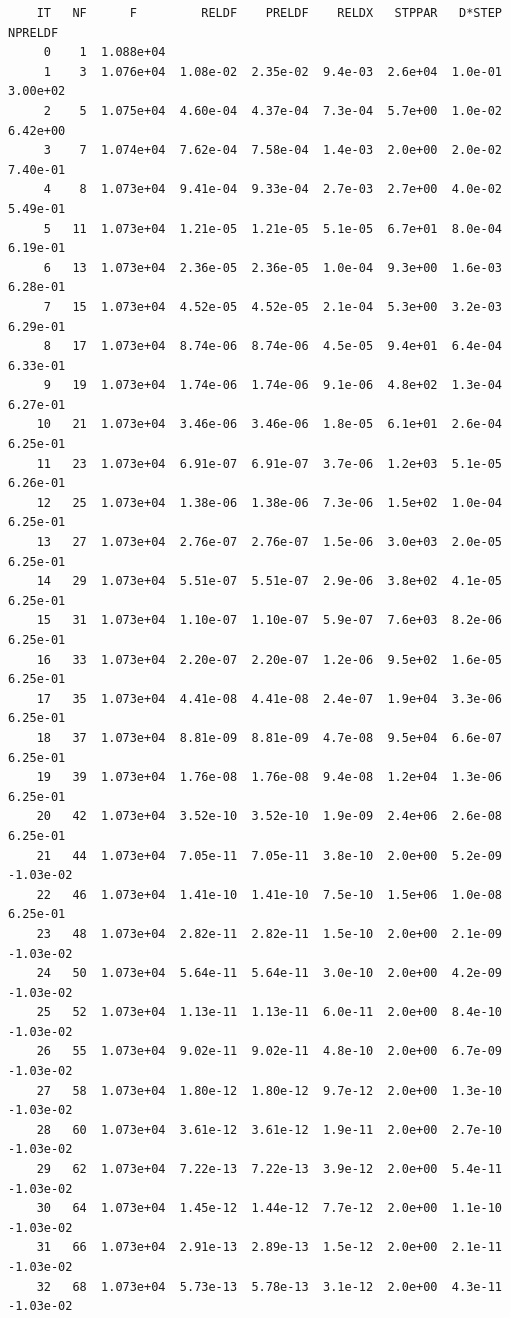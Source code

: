 \documentclass[11pt]{article}\usepackage[]{graphicx}\usepackage[]{color}
\makeatletter
\newenvironment{kframe}{%
 \def\at@end@of@kframe{}%
 \ifinner\ifhmode%
  \def\at@end@of@kframe{\end{minipage}}%
  \begin{minipage}{\columnwidth}%
 \fi\fi%
 \def\FrameCommand##1{\hskip\@totalleftmargin \hskip-\fboxsep
 \colorbox{shadecolor}{##1}\hskip-\fboxsep
     \hskip-\linewidth \hskip-\@totalleftmargin \hskip\columnwidth}%
 \MakeFramed {\advance\hsize-\width
   \@totalleftmargin\z@ \linewidth\hsize
   \@setminipage}}%
 {\par\unskip\endMakeFramed%
 \at@end@of@kframe}
\newenvironment{knitrout}{}{} %
\makeatother
\begin{document}
\begin{knitrout}
\begin{kframe}
\begin{verbatim}
    IT   NF      F         RELDF    PRELDF    RELDX   STPPAR   D*STEP   NPRELDF
     0    1  1.088e+04
     1    3  1.076e+04  1.08e-02  2.35e-02  9.4e-03  2.6e+04  1.0e-01  3.00e+02
     2    5  1.075e+04  4.60e-04  4.37e-04  7.3e-04  5.7e+00  1.0e-02  6.42e+00
     3    7  1.074e+04  7.62e-04  7.58e-04  1.4e-03  2.0e+00  2.0e-02  7.40e-01
     4    8  1.073e+04  9.41e-04  9.33e-04  2.7e-03  2.7e+00  4.0e-02  5.49e-01
     5   11  1.073e+04  1.21e-05  1.21e-05  5.1e-05  6.7e+01  8.0e-04  6.19e-01
     6   13  1.073e+04  2.36e-05  2.36e-05  1.0e-04  9.3e+00  1.6e-03  6.28e-01
     7   15  1.073e+04  4.52e-05  4.52e-05  2.1e-04  5.3e+00  3.2e-03  6.29e-01
     8   17  1.073e+04  8.74e-06  8.74e-06  4.5e-05  9.4e+01  6.4e-04  6.33e-01
     9   19  1.073e+04  1.74e-06  1.74e-06  9.1e-06  4.8e+02  1.3e-04  6.27e-01
    10   21  1.073e+04  3.46e-06  3.46e-06  1.8e-05  6.1e+01  2.6e-04  6.25e-01
    11   23  1.073e+04  6.91e-07  6.91e-07  3.7e-06  1.2e+03  5.1e-05  6.26e-01
    12   25  1.073e+04  1.38e-06  1.38e-06  7.3e-06  1.5e+02  1.0e-04  6.25e-01
    13   27  1.073e+04  2.76e-07  2.76e-07  1.5e-06  3.0e+03  2.0e-05  6.25e-01
    14   29  1.073e+04  5.51e-07  5.51e-07  2.9e-06  3.8e+02  4.1e-05  6.25e-01
    15   31  1.073e+04  1.10e-07  1.10e-07  5.9e-07  7.6e+03  8.2e-06  6.25e-01
    16   33  1.073e+04  2.20e-07  2.20e-07  1.2e-06  9.5e+02  1.6e-05  6.25e-01
    17   35  1.073e+04  4.41e-08  4.41e-08  2.4e-07  1.9e+04  3.3e-06  6.25e-01
    18   37  1.073e+04  8.81e-09  8.81e-09  4.7e-08  9.5e+04  6.6e-07  6.25e-01
    19   39  1.073e+04  1.76e-08  1.76e-08  9.4e-08  1.2e+04  1.3e-06  6.25e-01
    20   42  1.073e+04  3.52e-10  3.52e-10  1.9e-09  2.4e+06  2.6e-08  6.25e-01
    21   44  1.073e+04  7.05e-11  7.05e-11  3.8e-10  2.0e+00  5.2e-09 -1.03e-02
    22   46  1.073e+04  1.41e-10  1.41e-10  7.5e-10  1.5e+06  1.0e-08  6.25e-01
    23   48  1.073e+04  2.82e-11  2.82e-11  1.5e-10  2.0e+00  2.1e-09 -1.03e-02
    24   50  1.073e+04  5.64e-11  5.64e-11  3.0e-10  2.0e+00  4.2e-09 -1.03e-02
    25   52  1.073e+04  1.13e-11  1.13e-11  6.0e-11  2.0e+00  8.4e-10 -1.03e-02
    26   55  1.073e+04  9.02e-11  9.02e-11  4.8e-10  2.0e+00  6.7e-09 -1.03e-02
    27   58  1.073e+04  1.80e-12  1.80e-12  9.7e-12  2.0e+00  1.3e-10 -1.03e-02
    28   60  1.073e+04  3.61e-12  3.61e-12  1.9e-11  2.0e+00  2.7e-10 -1.03e-02
    29   62  1.073e+04  7.22e-13  7.22e-13  3.9e-12  2.0e+00  5.4e-11 -1.03e-02
    30   64  1.073e+04  1.45e-12  1.44e-12  7.7e-12  2.0e+00  1.1e-10 -1.03e-02
    31   66  1.073e+04  2.91e-13  2.89e-13  1.5e-12  2.0e+00  2.1e-11 -1.03e-02
    32   68  1.073e+04  5.73e-13  5.78e-13  3.1e-12  2.0e+00  4.3e-11 -1.03e-02

\end{verbatim}
\end{kframe}
\end{knitrout}
\end{document}
